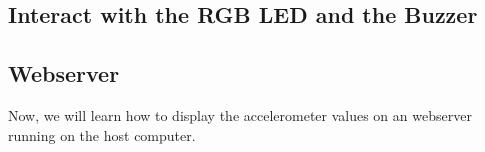 


\subsection{Interact with the RGB LED and the Buzzer}




\subsection{Webserver}
Now, we will learn how to display the accelerometer values on an webserver running
on the host computer.






